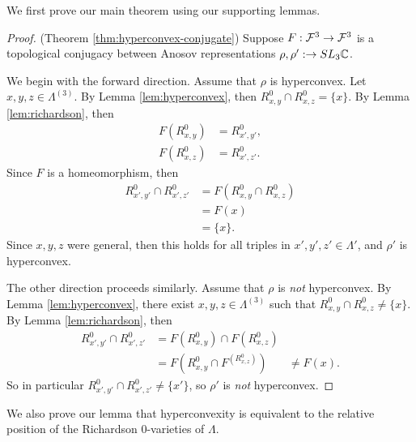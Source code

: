 We first prove our main theorem using our supporting lemmas.
\begin{proof}(Theorem \ref{thm:hyperconvex-conjugate})
    Suppose $F:\mathcal{F}^3 \rightarrow \mathcal{F}^3$ is a topological conjugacy between 
    Anosov representations $\rho,\rho':\rightarrow SL_3\mathbb{C}$.

    We begin with the forward direction. 
    Assume that $\rho$ is hyperconvex. Let $x,y,z \in \Lambda^{(3)}$.
    By Lemma \ref{lem:hyperconvex}, then $R^0_{x,y} \cap R^0_{x,z} = \{x\}$.
    By Lemma \ref{lem:richardson}, then 
    \begin{align}
        F(R^0_{x,y}) &= R^0_{x',y'}, \\
        F(R^0_{x,z}) &= R^0_{x',z'}.
    \end{align}
    Since $F$ is a homeomorphism, then
    \begin{align}
        R^0_{x',y'} \cap R^0_{x',z'} 
        &= F(R^0_{x,y} \cap R^0_{x,z}) \\
        &= F(x) \\
        &= \{x\}.
    \end{align} 
    Since $x,y,z$ were general, then this holds for all triples in $x',y',z' \in \Lambda'$, 
    and $\rho'$ is hyperconvex.

    The other direction proceeds similarly. Assume that $\rho$ is \emph{not} hyperconvex. 
    By Lemma \ref{lem:hyperconvex}, there exist $x,y,z \in \Lambda^{(3)}$ such that 
    $R^0_{x,y} \cap R^0_{x,z} \neq \{x\}$.
    By Lemma \ref{lem:richardson}, 
    then \begin{align}
        R^0_{x',y'} \cap R^0_{x',z'} 
        &= F(R^0_{x,y}) \cap F(R^0_{x,z}) \\
        &= F(R^0_{x,y} \cap F^(R^0_{x,z}))
        &\neq F(x). 
    \end{align}
        So in particular $R^0_{x',y'} \cap R^0_{x',z'} \neq \{x'\}$, 
        so $\rho'$ is \emph{not} hyperconvex.
\end{proof}
We also prove our lemma that hyperconvexity is equivalent to 
the relative position of the Richardson 0-varieties of $\Lambda$.
